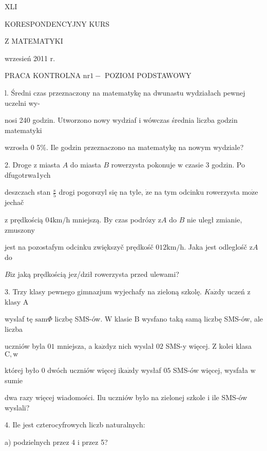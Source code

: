\documentclass[a4paper,12pt]{article}
\begin{document}
XLI

KORESPONDENCYJNY KURS

Z MATEMATYKI

wrzesień 2011 r.

PRACA KONTROLNA $\mathrm{n}\mathrm{r} 1 -$ POZIOM PODSTAWOWY

l. Średni czas przeznaczony na matematykę na dwunastu wydziałach pewnej uczelni wy-

nosi 240 godzin. Utworzono nowy wydziaf $\mathrm{i}$ wówczas średnia liczba godzin matematyki

wzrosła $0$ 5\%. Ile godzin przeznaczono na matematykę na nowym wydziale?

2. Droge $\mathrm{z}$ miasta $A$ do miasta $B$ rowerzysta pokonuje $\mathrm{w}$ czasie 3 godzin. Po dfugotrwa1ych

deszczach stan $\displaystyle \frac{\mathrm{s}}{5}$ drogi pogorszyl się na tyle, $\dot{\mathrm{z}}\mathrm{e}$ na tym odcinku rowerzysta $\mathrm{m}\mathrm{o}\dot{\mathrm{z}}\mathrm{e}$ jechač

$\mathrm{z}$ prędkością $04\mathrm{k}\mathrm{m}/\mathrm{h}$ mniejszą. By czas podrózy $\mathrm{z}A$ do $B$ nie uległ zmianie, zmuszony

jest na pozostafym odcinku zwiększyč prędkośč $012\mathrm{k}\mathrm{m}/\mathrm{h}$. Jaka jest odleglośč $\mathrm{z}A$ do

$B\mathrm{i}\mathrm{z}$ jaką prędkością jez/dził rowerzysta przed ulewami?

3. Trzy klasy pewnego gimnazjum wyjechafy na zieloną szkolę. $K\mathrm{a}\dot{\mathrm{z}}\mathrm{d}\mathrm{y}$ uczeń $\mathrm{z}$ klasy $\mathrm{A}$

wyslaf tę $\mathrm{s}\mathrm{a}\mathrm{m}\Phi$ liczbę SMS-ów. $\mathrm{W}$ klasie $\mathrm{B}$ wysfano taką samą liczbę SMS-ów, ale liczba

uczniów byla $01$ mniejsza, a $\mathrm{k}\mathrm{a}\dot{\mathrm{z}}\mathrm{d}\mathrm{y}\mathrm{z}$ nich wyslał $02$ SMS-y więcej. $\mathrm{Z}$ kolei klasa $\mathrm{C}, \mathrm{w}$

której było $0$ dwóch uczniów więcej $\mathrm{i}\mathrm{k}\mathrm{a}\dot{\mathrm{z}}\mathrm{d}\mathrm{y}$ wysłaf $05$ SMS-ów więcej, wysfała $\mathrm{w}$ sumie

dwa razy więcej wiadomości. Ilu uczniów bylo na zielonej szkole $\mathrm{i}$ ile SMS-ów wyslali?

4. Ile jest czterocyfrowych liczb naturalnych:

a) podzielnych przez 4 $\mathrm{i}$ przez 5?
\end{document}
